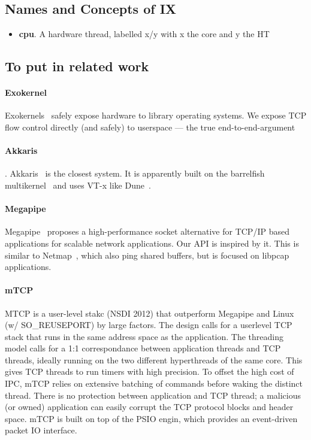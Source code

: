 \subsection{Names and Concepts of IX}

\begin{itemize}
\item {\bf cpu}. A hardware thread, labelled x/y with x the core and y the HT
\end{itemize}


\subsection{To put in related work}


\paragraph*{Exokernel}   Exokernels~\cite{DBLP:conf/sosp/EnglerKO95} safely expose hardware to library operating systems.  We expose TCP flow control directly (and safely) to userspace --- the true end-to-end-argument~\cite{DBLP:journals/tocs/SaltzerRC84}


\paragraph*{Akkaris}.  
Akkaris~\cite{peter2013arrakis} is the closest system.  It is
apparently built on the barrelfish multikernel~\cite{DBLP:conf/sosp/BaumannBDHIPRSS09} and uses VT-x
like Dune~\cite{belay2012dune}.

\paragraph*{Megapipe} 
Megapipe~\cite{han2012megapipe} proposes a high-performance socket
alternative for TCP/IP based applications for scalable network
applications.  Our API is inspired by it. This is similar to
Netmap~\cite{rizzo2012netmap}, which also ping shared buffers, but is
focused on libpcap applications.


\paragraph{mTCP}

MTCP is a user-level stakc (NSDI 2012) that outperform Megapipe and
Linux (w/ SO\_REUSEPORT) by large factors.  The design calls for a
userlevel TCP stack that runs in the same address space as the
application. The threading model calls for a 1:1 correspondance
between application threads and TCP threads, ideally running on the
two different hyperthreads of the same core.  This gives TCP threads
to run timers with high precision.  To offset the high cost of IPC,
mTCP relies on extensive batching of commands before waking the
distinct thread.  There is no protection between application and TCP
thread; a malicious (or owned) application can easily corrupt the TCP
protocol blocks and header space.  mTCP is built on top of the PSIO
engin, which provides an event-driven packet IO interface.

